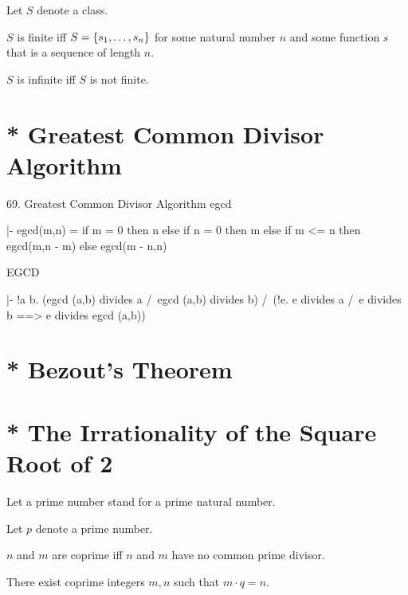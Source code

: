 \documentclass{article}
\begin{document}
\begin{forthel}

Let $S$ denote a class.

\begin{definition}
$S$ is finite iff
$S = \{s_{1},\dots,s_{n}\}$ for some natural number $n$ and some function $s$ that is
a sequence of length $n$.
\end{definition}

\begin{definition}
$S$ is infinite iff $S$ is not finite.
\end{definition}

\end{forthel}

\section{* Greatest Common Divisor Algorithm}

 69. Greatest Common Divisor Algorithm
egcd

  |- egcd(m,n) = if m = 0 then n
                 else if n = 0 then m
                 else if m <= n then egcd(m,n - m)
                 else egcd(m - n,n)

EGCD

  |- !a b. (egcd (a,b) divides a /\ egcd (a,b) divides b) /\
           (!e. e divides a /\ e divides b ==> e divides egcd (a,b))


\section{* Bezout's Theorem}

\section{* The Irrationality of the Square Root of 2}


    Let a prime number stand for a prime natural number.

    Let $p$ denote a prime number.

    \begin{definition}
      $n$ and $m$ are coprime iff $n$ and $m$ have no common prime divisor.
    \end{definition}

    \begin{axiom}
      There exist coprime integers $m,n$ such that $m \cdot q = n$.
    \end{axiom}
\end{document}

